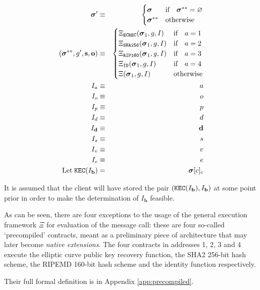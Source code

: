 \documentclass[9pt,oneside]{amsart}
\begin{document}
\begin{multicols}{2}
\begin{eqnarray}
\boldsymbol{\sigma}' & \equiv & \begin{cases}
\boldsymbol{\sigma} & \text{if} \quad \boldsymbol{\sigma}^{**} = \varnothing \\
\boldsymbol{\sigma}^{**} & \text{otherwise}
\end{cases} \\
(\boldsymbol{\sigma}^{**}, g', \mathbf{s}, \mathbf{o}) & \equiv & \begin{cases}
\Xi_{\mathtt{ECREC}}(\boldsymbol{\sigma}_1, g, I) & \text{if} \quad a = 1 \\
\Xi_{\mathtt{SHA256}}(\boldsymbol{\sigma}_1, g, I) & \text{if} \quad a = 2 \\
\Xi_{\mathtt{RIP160}}(\boldsymbol{\sigma}_1, g, I) & \text{if} \quad a = 3 \\
\Xi_{\mathtt{ID}}(\boldsymbol{\sigma}_1, g, I) & \text{if} \quad a = 4 \\
\Xi(\boldsymbol{\sigma}_1, g, I) & \text{otherwise} \end{cases} \\
I_a & \equiv & a \\
I_o & \equiv & o \\
I_p & \equiv & p \\
I_d & \equiv & d \\
I_\mathbf{d} & \equiv & \mathbf{d} \\
I_s & \equiv & s \\
I_v & \equiv & v \\
I_e & \equiv & e \\
\text{Let} \; \mathtt{\tiny KEC}(I_\mathbf{b}) & = & \boldsymbol{\sigma}[c]_c
\end{eqnarray}

It is assumed that the client will have stored the pair $(\mathtt{\tiny KEC}(I_\mathbf{b}), I_\mathbf{b})$ at some point prior in order to make the determination of $I_\mathbf{b}$ feasible.

As can be seen, there are four exceptions to the usage of the general execution framework $\Xi$ for evaluation of the message call: these are four so-called `precompiled' contracts, meant as a preliminary piece of architecture that may later become \textit{native extensions}. The four contracts in addresses 1, 2, 3 and 4 execute the elliptic curve public key recovery function, the SHA2 256-bit hash scheme, the RIPEMD 160-bit hash scheme and the identity function respectively.

Their full formal definition is in Appendix \ref{app:precompiled}.


\end{multicols}
\end{document}
